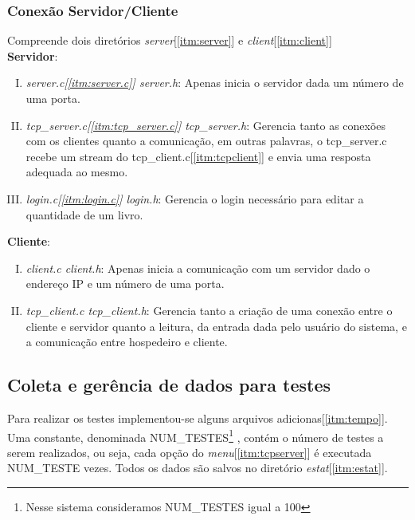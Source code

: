 \documentclass[a4paper,10pt]{article}
\begin{document}
\subsubsection{Conexão Servidor/Cliente}
Compreende dois diretórios \emph{server}[\ref{itm:server}] e \emph{client}[\ref{itm:client}]
\\\textbf{Servidor}:
\begin{enumerate}[I.] \item \emph{server.c[\ref{itm:server.c}] server.h}: Apenas inicia o servidor
dada um número de uma porta.
\item \label{itm:tcpserver} \emph{tcp\_server.c[\ref{itm:tcp_server.c}] tcp\_server.h}: Gerencia tanto
as conexões com os clientes quanto a comunicação, em outras palavras, o
tcp\_server.c recebe um stream do tcp\_client.c[\ref{itm:tcpclient}] e envia uma
resposta adequada ao mesmo.
\item \emph{login.c[\ref{itm:login.c}] login.h}: Gerencia o login necessário para editar a
quantidade de um livro.
\end{enumerate}
\textbf{Cliente}:
\begin{enumerate}[I.]
\item \emph{client.c client.h}: Apenas inicia a comunicação com um servidor dado o endereço IP e um número de uma porta.
\item \label{itm:tcpclient} \emph{tcp\_client.c tcp\_client.h}: Gerencia tanto 
a criação de uma conexão entre o cliente e servidor quanto a leitura, da entrada dada pelo usuário do sistema, e a comunicação entre hospedeiro e cliente.
\end{enumerate}
\subsection{Coleta e gerência de dados para testes}
Para realizar os testes implementou-se alguns arquivos adicionas[\ref{itm:tempo}]. Uma constante, denominada NUM\_TESTES\footnote{Nesse sistema consideramos NUM\_TESTES igual a 100} , contém o número de testes a serem realizados, ou seja, cada opção do \emph{menu}[\ref{itm:tcpserver}] é executada NUM\_TESTE vezes. Todos os dados são 
salvos no diretório \emph{estat}[\ref{itm:estat}].
\end{document}
